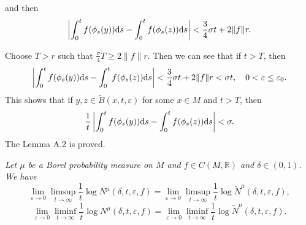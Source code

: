 \documentclass[10pt]{article}
\newtheorem*{Theorem A}{Theorem A}
\begin{document}
\noindent
and then
\[
\left| \int_0^t f( \phi_s (y) ) {\rm d}s - \int_0^t f( \phi_s (z) ) {\rm d}s \right| < \frac{3}{4}\sigma t + 2 \|f\| r.
\]

\noindent
Choose \( T > r \) such that \( \frac{\sigma}{4} T \geq 2 \|f\| r \). Then we can see that if \( t > T \), then
\[
\left| \int_0^t f( \phi_s (y) ) {\rm d}s - \int_0^t f( \phi_s (z) ) {\rm d}s \right| < \frac{3}{4} \sigma t + 2 \|f\| r < \sigma t ,\quad 0 < \varepsilon \leq \varepsilon_0.
\]
This shows that if \( y, z \in \tilde{B}(x, t, \varepsilon) \) for some \( x \in M\) and \( t > T \), then
\[
\frac{1}{t} \left| \int_0^t f( \phi_s (y) ) {\rm d}s - \int_0^t f( \phi_s (z) ) {\rm d}s \right| < \sigma.
\]
The Lemma A.2 is proved. \hfill \qedsymbol

\bigskip


\bigskip
{} {\it Let $\mu$ be a Borel probability measure on $M$ and $f\in C(M, \mathbb{R})$ and $\delta\in(0,1)$. We have
$$\lim_{\varepsilon \to 0} \limsup_{t \to \infty} \frac{1}{t} \log N^\mu(\delta, t, \varepsilon, f) = \lim_{\varepsilon \to 0} \limsup_{t \to \infty} \frac{1}{t} \log \tilde{N}^\mu(\delta, t, \varepsilon, f),$$
$$\lim_{\varepsilon \to 0} \liminf_{t \to \infty} \frac{1}{t} \log N^\mu(\delta, t, \varepsilon, f) = \lim_{\varepsilon \to 0} \liminf_{t \to \infty} \frac{1}{t} \log \tilde{N}^\mu(\delta, t, \varepsilon, f).$$}
\end{document}
